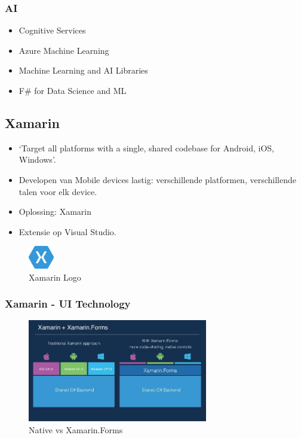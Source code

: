 \documentclass{article}
\begin{document}
\subsubsection{AI}

\begin{itemize}
    \item Cognitive Services
    \item Azure Machine Learning
    \item Machine Learning and AI Libraries
    \item F\# for Data Science and ML
\end{itemize}

\subsection{Xamarin}
\begin{itemize}
    \item `Target all platforms with a single, shared codebase for Android, iOS, Windows'. 
    \item Developen van Mobile devices lastig: verschillende platformen, verschillende talen voor elk device.
    \item Oplossing: Xamarin
    \item Extensie op Visual Studio.
\end{itemize}


\begin{figure}[H]
    \centering
    \includegraphics[width=0.1\textwidth]{xamarin-logo.png}
    \caption{Xamarin Logo}
\end{figure}

\subsubsection{Xamarin - UI Technology}
\begin{figure}[H]
    \centering
    \includegraphics[width=0.7\textwidth]{xamarin-forms.png}
    \caption{Native vs Xamarin.Forms}
\end{figure}
\end{document}
